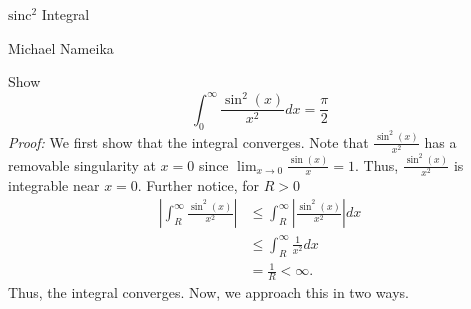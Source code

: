 \documentclass{article}
\begin{document}
\begin{center}
    {\huge $\text{sinc}^2$ Integral}
    \vspace{0.5cm}

    {\large Michael Nameika}
\end{center}
Show 
\[\int_{0}^{\infty}\frac{\sin^2(x)}{x^2}dx = \frac{\pi}{2}\]
\textit{Proof:} We first show that the integral converges. Note that $\frac{\sin^2(x)}{x^2}$ has a removable singularity at $x = 0$ since ${\displaystyle \lim_{x \to 0}\frac{\sin(x)}{x} = 1}$. Thus, $\frac{\sin^2(x)}{x^2}$ is integrable near $x = 0$. Further notice, for $R > 0$
\begin{align*}
    \left|\int_R^{\infty}\frac{\sin^2(x)}{x^2}\right| &\leq \int_R^{\infty}\left|\frac{\sin^2(x)}{x^2}\right|dx\\
    &\leq  \int_R^{\infty}\frac{1}{x^2}dx\\
    &= \frac{1}{R} < \infty.
\end{align*}
Thus, the integral converges. Now, we approach this in two ways.
\end{document}
